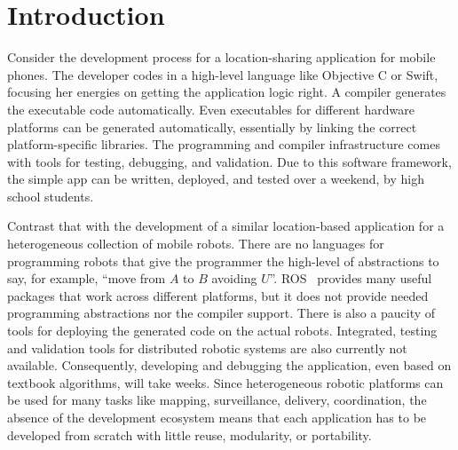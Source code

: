 \section{Introduction}
\label{sec:intro}

Consider the development process for a location-sharing application for mobile phones. 
The developer codes in a high-level language like Objective C or Swift, focusing her energies on getting the application logic right. 
A compiler generates the executable code automatically.  
Even executables for different hardware platforms can  be generated automatically, essentially by linking the correct platform-specific libraries. 
The programming and compiler infrastructure comes with tools for testing, debugging, and validation. 
Due to this software framework, the simple app can be written, deployed, and tested over a weekend, by high school students. 
%

Contrast that with the development of a similar location-based application for a heterogeneous collection of mobile robots. 
There are no languages for programming  robots that give the programmer the high-level of abstractions to say, for example, ``move from $A$ to $B$ avoiding $U$''. 
ROS~\cite{ros} provides many useful packages that work across different platforms, but it does not provide needed programming abstractions nor the compiler support. 
There is also a paucity of tools for deploying the generated code on the actual robots. 
Integrated, testing and validation tools for distributed robotic systems are also currently not available. 
Consequently, developing and debugging the application, even based on textbook algorithms, will take weeks. 
Since heterogeneous robotic platforms can be used for many tasks like mapping, surveillance, delivery, coordination,  the absence of the development ecosystem means that each application has to be developed from scratch with little reuse, modularity, or portability. 


